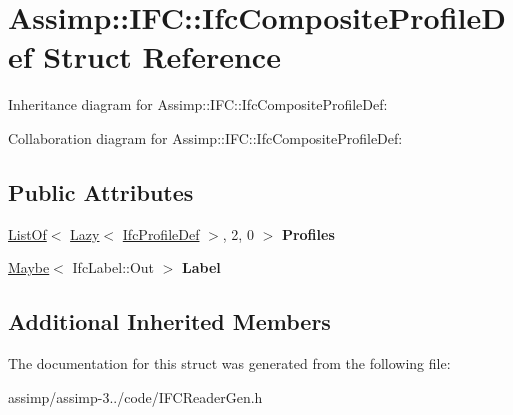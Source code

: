 \hypertarget{struct_assimp_1_1_i_f_c_1_1_ifc_composite_profile_def}{\section{Assimp\+:\+:I\+F\+C\+:\+:Ifc\+Composite\+Profile\+Def Struct Reference}
\label{struct_assimp_1_1_i_f_c_1_1_ifc_composite_profile_def}
}


Inheritance diagram for Assimp\+:\+:I\+F\+C\+:\+:Ifc\+Composite\+Profile\+Def\+:


Collaboration diagram for Assimp\+:\+:I\+F\+C\+:\+:Ifc\+Composite\+Profile\+Def\+:
\subsection*{Public Attributes}
\begin{DoxyCompactItemize}
\item 
\hypertarget{struct_assimp_1_1_i_f_c_1_1_ifc_composite_profile_def_a1725c109ed2513a2c67aacc87e9dfb6e}{\hyperlink{struct_assimp_1_1_s_t_e_p_1_1_list_of}{List\+Of}$<$ \hyperlink{struct_assimp_1_1_s_t_e_p_1_1_lazy}{Lazy}$<$ \hyperlink{struct_assimp_1_1_i_f_c_1_1_ifc_profile_def}{Ifc\+Profile\+Def} $>$, 2, 0 $>$ {\bfseries Profiles}}\label{struct_assimp_1_1_i_f_c_1_1_ifc_composite_profile_def_a1725c109ed2513a2c67aacc87e9dfb6e}

\item 
\hypertarget{struct_assimp_1_1_i_f_c_1_1_ifc_composite_profile_def_a79a4c5db3c4a0d86769a3371302546d7}{\hyperlink{struct_assimp_1_1_s_t_e_p_1_1_maybe}{Maybe}$<$ Ifc\+Label\+::\+Out $>$ {\bfseries Label}}\label{struct_assimp_1_1_i_f_c_1_1_ifc_composite_profile_def_a79a4c5db3c4a0d86769a3371302546d7}

\end{DoxyCompactItemize}
\subsection*{Additional Inherited Members}


The documentation for this struct was generated from the following file\+:\begin{DoxyCompactItemize}
\item 
assimp/assimp-\/3../code/I\+F\+C\+Reader\+Gen.\+h\end{DoxyCompactItemize}
